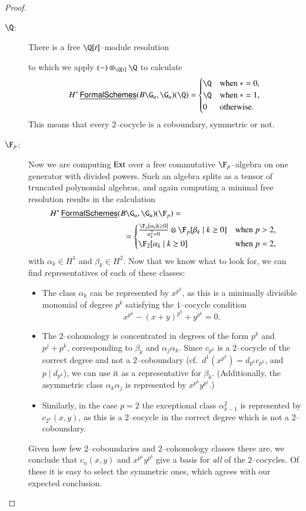 \begin{proof}
\begin{description}
\item[$\Q$:] There is a free $\Q[t]$--module resolution
\begin{center}
\end{center}
to which we apply $(-) \otimes_{\Q[t]} \Q$ to calculate \[H^* \InternalHom{FormalSchemes}(B\G_a, \G_a)(\Q) = \begin{cases} \Q & \text{when $* = 0$}, \\ \Q & \text{when $* = 1$}, \\ 0 & \text{otherwise}. \end{cases}\] This means that every $2$--cocycle is a coboundary, symmetric or not.
\item[$\F_p$:] Now we are computing $\operatorname{Ext}$ over a free commutative $\F_p$--algebra on one generator with divided powers.  Such an algebra splits as a tensor of truncated polynomial algebras, and again computing a minimal free resolution results in the calculation
\[H^* \InternalHom{FormalSchemes}(B\G_a, \G_a)(\F_p) =\hspace{12em}\]
\[\hspace{9em}=
\begin{cases}
\frac{\F_p[\alpha_k \mid k \ge 0]}{\alpha_k^2 = 0} \otimes \F_p[\beta_k \mid k \ge 0] & \text{when $p > 2$}, \\
\F_2[\alpha_k \mid k \ge 0] & \text{when $p = 2$},
\end{cases}\] with $\alpha_k \in H^1$ and $\beta_k \in H^2$.  Now that we know what to look for, we can find representatives of each of these classes:
\begin{itemize}
\item The class $\alpha_k$ can be represented by $x^{p^k}$, as this is a minimally divisible monomial of degree $p^k$ satisfying the $1$--cocycle condition \[x^{p^k} - (x+y)^{p^k} + y^{p^k} = 0.\]
\item The $2$--cohomology is concentrated in degrees of the form $p^k$ and $p^j + p^k$, corresponding to $\beta_k$ and $\alpha_j \alpha_k$.  Since $c_{p^k}$ is a $2$--cocycle of the correct degree and not a $2$--coboundary (cf.\ $d^1(x^{p^k}) = d_{p^k} c_{p^k}$, and $p \mid d_{p^k}$), we can use it as a representative for $\beta_k$.  (Additionally, the asymmetric class $\alpha_k \alpha_j$ is represented by $x^{p^k} y^{p^j}$.)
\item Similarly, in the case $p = 2$ the exceptional class $\alpha_{k-1}^2$ is represented by $c_{2^k}(x, y)$, as this is a $2$--cocycle in the correct degree which is not a $2$--coboundary.
\end{itemize}
Given how few $2$--coboundaries and $2$--cohomology classes there are, we conclude that $c_n(x, y)$ and $x^{p^a} y^{p^b}$ give a basis for \emph{all} of the $2$--cocycles.  Of these it is easy to select the symmetric ones, which agrees with our expected conclusion. \qedhere
\end{description}
\end{proof}

